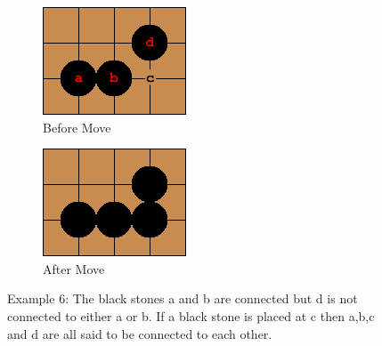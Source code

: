 \documentclass{l4proj}
\begin{document}
\begin{figure}[!ht]
\centering
\begin{subfigure}[b]{0.45\textwidth}
\centering
\includegraphics[width=\textwidth]{ex/Ex6-0.png}
\caption{Before Move}
\label{fig:ex6-0}
\end{subfigure}
\begin{subfigure}[b]{0.45\textwidth}
\centering
\includegraphics[width=\textwidth]{ex/Ex6-1.png}
\caption{After Move}
\label{fig:ex6-1}
\end{subfigure}
\caption{Example 6: The black stones a and b are connected but d is not connected to either a or b. If a black stone is placed at c then a,b,c and d are all said to be connected to each other.}
\label{fig:ex6}
\end{figure}
\end{document}
